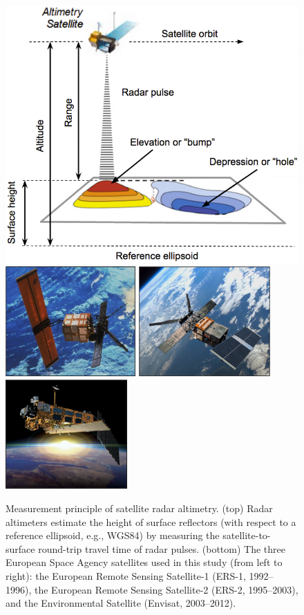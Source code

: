 \begin{figure}[!ht]
  \centering
  \includegraphics[width=.74\textwidth]{img/altimetry_principle.png} \\[.5cm]
  \includegraphics[height=4.2cm]{img/ers1.png}
  \includegraphics[height=4.2cm]{img/ers2.png}
  \includegraphics[height=4.2cm]{img/envisat.png}
  \caption[Measurement principle of satellite radar altimetry]{
  \ssp \footnotesize
  Measurement principle of satellite radar altimetry. (top) Radar altimeters estimate the height of surface reflectors (with respect to a reference ellipsoid, e.g., WGS84) by measuring the satellite-to-surface round-trip travel time of radar pulses. (bottom) The three European Space Agency satellites used in this study (from left to right): the European Remote Sensing Satellite-1 (ERS-1, 1992--1996), the European Remote Sensing Satellite-2 (ERS-2, 1995--2003), and the Environmental Satellite (Envisat, 2003--2012).
  }
  \label{fig:ra-principle}
\end{figure}
\clearpage

